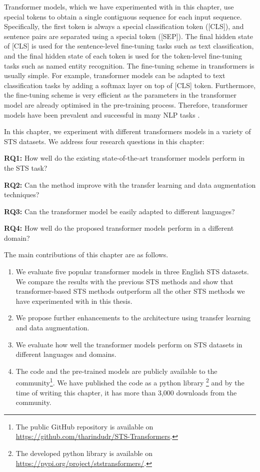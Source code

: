Transformer models, which we have experimented with in this chapter, use special tokens to obtain a single contiguous sequence for each input sequence. Specifically, the first token is always a special classification token (\textsc{[CLS]}), and sentence pairs are separated using a special token (\textsc{[SEP]}). The final hidden state of \textsc{[CLS]}  is used for the sentence-level fine-tuning tasks such as text classification, and the final hidden state of each token is used for the token-level fine-tuning tasks such as named entity recognition. The fine-tuning scheme in transformers is usually simple. For example, transformer models can be adapted to text classification tasks by adding a softmax layer on top of \textsc{[CLS]} token. Furthermore, the fine-tuning scheme is very efficient as the parameters in the transformer model are already optimised in the pre-training process. Therefore, transformer models have been prevalent and successful in many NLP tasks \autocite{devlin-etal-2019-bert}. 

In this chapter, we experiment with different transformers models in a variety of STS datasets. 
We address four research questions in this chapter:

\textbf{RQ1:} How well do the existing state-of-the-art transformer models perform in the STS task? 

\textbf{RQ2:} Can the method improve with the transfer learning and data augmentation techniques?

\textbf{RQ3:} Can the transformer model be easily adapted to different languages?

\textbf{RQ4:} How well do the proposed transformer models perform in a different domain? 

The main contributions of this chapter are as follows.

\begin{enumerate}
\item We evaluate five popular transformer models in three English STS datasets. We compare the results with the previous STS methods and show that transformer-based STS methods outperform all the other STS methods we have experimented with in this thesis.

\item We propose further enhancements to the architecture using transfer learning and data augmentation.   

\item We evaluate how well the transformer models perform on STS datasets in different languages and domains. 

\item The code and the pre-trained models are publicly available to the community\footnote{The public GitHub repository is available on \url{https://github.com/tharindudr/STS-Transformers}.}. We have published the code as a python library \footnote{The developed python library is available on \url{https://pypi.org/project/ststransformers/}.} and by the time of writing this chapter, it has more than 3,000 downloads from the community. 

\end{enumerate}

